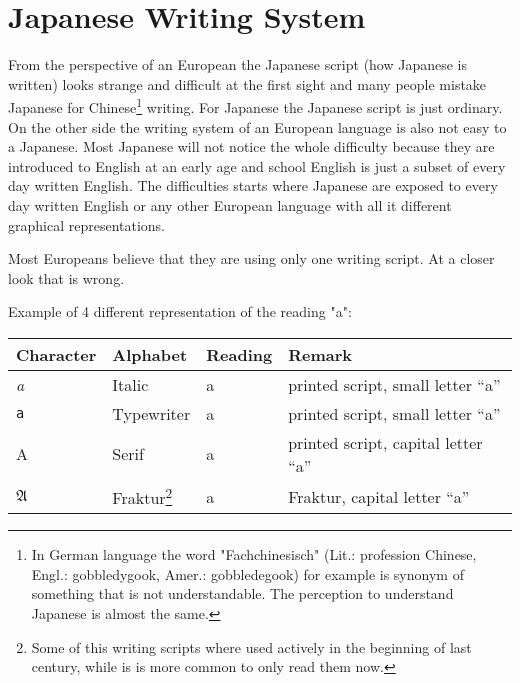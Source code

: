 \chapter{Japanese Writing System}
\label{chap:JapaneseWritingSystem}


From the perspective of an European the Japanese script (how Japanese is
written) looks strange and difficult at the first sight and many people mistake
Japanese for Chinese\footnote{In German language the word "Fachchinesisch"
(Lit.: profession Chinese, Engl.: gobbledygook, Amer.: gobbledegook) for
example is synonym of something that is not understandable. The perception to
understand Japanese is almost the same.} writing. For Japanese the Japanese
script is just ordinary. On the other side the writing system of an European
language is also not easy to a Japanese. Most Japanese will not notice the
whole difficulty because they are introduced to English at an early age and
school English is just a subset of every day written English. The difficulties
starts where Japanese are exposed to every day written English or any other
European language with all it different graphical representations.

Most Europeans believe that they are using only one writing script. At a closer
look that is wrong.

\bigskip Example of 4 different representation of the reading "a":

\begin{center}
\begin{tabular}{|l|l|l|l|}
\textbf{Character}&\textbf{Alphabet}&\textbf{Reading}&\textbf{Remark}\\\hline
\textit{a}     &  Italic        & a & printed script, small letter ``a'' \\ 
\texttt{a}     &  Typewriter    & a & printed script, small letter ``a'' \\ 
A              &  Serif         & a & printed script, capital letter ``a'' \\ 
$\mathfrak{A}$ & Fraktur\footnote{Some of this writing scripts where used 
actively in the beginning of last century, while is is more common to only 
read them now.}& a & Fraktur, capital letter ``a''  \\ 
\end{tabular}
\end{center}


